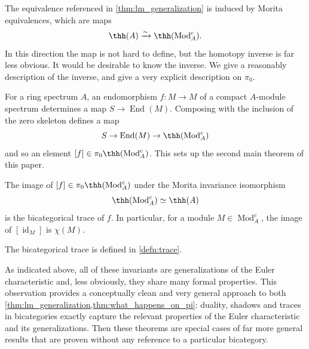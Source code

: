 \documentclass[11pt]{amsart}
\newcommand{\xto}{\xrightarrow}
\begin{document}
The equivalence referenced in \cref{thm:lm_generalization} is induced by Morita equivalences, which are maps
\[
 \thh(A) \xto{\sim} \thh(\operatorname{Mod}^c_A).
\]
In this direction the map is not hard to define, but the homotopy inverse is far less obvious.  It would be desirable to know the inverse. We give a reasonably description of the inverse, and give a very explicit description on $\pi_0$.

For a ring spectrum $A$, an endomorphism $f\colon M \to M$ of a compact $A$-module spectrum determines a map 
$S\to \operatorname{End}(M) $.  Composing with the inclusion of the zero skeleton defines a map 
\[
  S\to \operatorname{End}(M) \to \thh(\operatorname{Mod}^c_A) 
\]
and so an element $[f] \in \pi_0 \thh(\operatorname{Mod}^c_A)$. This sets up the second main theorem of this paper. 

\begin{thm}\label{thm:what_happens_on_pi}
 The image of $[f] \in \pi_0 \thh(\operatorname{Mod}^c_A)$ under the Morita invariance isomorphism 
 \[
   \thh(\operatorname{Mod}^c_A) \simeq \thh(A)
  \]
  is the bicategorical trace of $f$. In particular, for a module $M \in \operatorname{Mod}^c_A$, the image of $[\operatorname{id}_M]$ is $\chi(M)$. 
\end{thm}

The bicategorical trace is defined in \cref{defn:trace}.

As indicated above, all of these invariants are generalizations of the Euler characteristic and, less obviously, they share many formal properties. This observation provides a conceptually clean and very general approach to both \cref{thm:lm_generalization,thm:what_happens_on_pi}:  duality, shadows and traces in bicategories \cite{p:thesis,ps:bicat} exactly capture the relevant properties of the Euler characteristic and its generalizations.  Then these theorems are special cases of far more general results that are proven without any reference to a particular bicategory.
\end{document}
